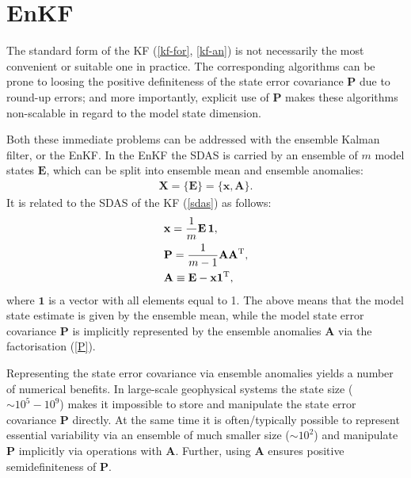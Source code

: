 \documentclass[11pt]{report}
\newcommand{\mb} {\mathbf}
\newcommand{\T}{^{\tiny \mathrm T}}
\begin{document}
\section{EnKF}

The standard form of the KF (\ref{kf-for}, \ref{kf-an}) is not necessarily the most convenient or suitable one in practice.
The corresponding algorithms can be prone to loosing the positive definiteness of the state error covariance $\mb P$ due to round-up errors; and more importantly, explicit use of $\mb P$ makes these algorithms non-scalable in regard to the model state dimension.

Both these immediate problems can be addressed with the ensemble Kalman filter, or the EnKF.
In the EnKF the SDAS is carried by an ensemble of $m$ model states $\mb E$, which can be split into ensemble mean and ensemble anomalies:
\begin{align}
  \label{sdas-enkf}
  \mb X = \{\mb E\} = \{\mb x, \mb A\}.
\end{align}
It is related to the SDAS of the KF (\ref{sdas}) as follows:
\begin{subequations}
  \label{E}
  \begin{align}
    \label{x}
    &\mb x = \frac{1}{m} \mb E \,\mb 1,\\
    \label{P}
    &\mb P = \frac{1}{m - 1} \mb A \mb A\T,\\
    \label{A}
    &\mb A \equiv \mb E - \mb x \mb 1\T,
  \end{align}
\end{subequations}
where $\mb 1$ is a vector with all elements equal to 1.
The above means that the model state estimate is given by the ensemble mean, while the model state error covariance $\mb P$ is implicitly represented by the ensemble anomalies $\mb A$ via the factorisation (\ref{P}).

Representing the state error covariance via ensemble anomalies yields a number of numerical benefits.
In large-scale geophysical systems the state size ($\sim 10^5-10^9$) makes it impossible to store and manipulate the state error covariance $\mb P$ directly.
At the same time it is often/typically possible to represent essential variability via an ensemble of much smaller size ($\sim 10^2$) and manipulate $\mb P$ implicitly via operations with $\mb A$.
Further, using $\mb A$ ensures positive semidefiniteness of $\mb P$.
\end{document}

